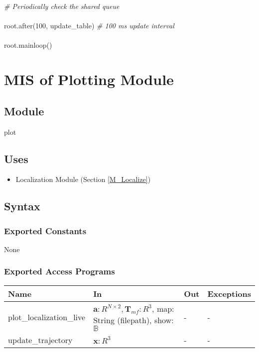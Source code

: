 \documentclass[12pt, titlepage]{article}
\begin{document}
\noindent \textit{\# Periodically check the shared queue}\\\\
root.after(100, update\_table)  \textit{\# 100 ms update interval}\\\\
root.mainloop()



\newpage

\section{MIS of Plotting Module} \label{M_Plotting}

\subsection{Module}

plot 

\subsection{Uses}
\begin{itemize}
  \item Localization Module (Section \ref{M_Localize})
\end{itemize}

\subsection{Syntax}

\subsubsection{Exported Constants}
None

\subsubsection{Exported Access Programs}

\begin{center}
\begin{tabular}{p{4cm} p{6cm} p{4cm} p{2cm}}
\hline
\textbf{Name} & \textbf{In} & \textbf{Out} & \textbf{Exceptions} \\
\hline
plot\_localization\_live & $\mathbf{a}: R^{N \times 2}, \mathbf{T}_{mf}: R^3$, map: String (filepath), show: $\mathbb{B}$  & - & - \\
\hline
update\_trajectory &  $\hat{\mathbf{x}}: R^3$ & - & - \\
\hline
\end{tabular}
\end{center}
\end{document}
